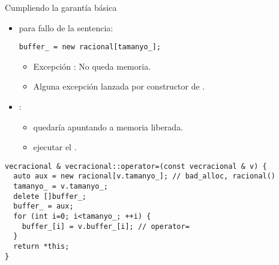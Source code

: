 \begin{frame}[t,fragile]{Cumpliendo la garantía básica}
\begin{itemize}
  \item {} para fallo de la sentencia:
\begin{lstlisting}
buffer_ = new racional[tamanyo_];
\end{lstlisting}
    \begin{itemize}
      \item Excepción : No queda memoria.
      \item Alguna excepción lanzada por constructor de .
    \end{itemize}

  \item {}:
    \begin{itemize}
      \item {} quedaría apuntando a memoria liberada.
      \item {} ejecutar el .
    \end{itemize}
\end{itemize}

\begin{lstlisting}
vecracional & vecracional::operator=(const vecracional & v) {
  auto aux = new racional[v.tamanyo_]; // bad_alloc, racional()
  tamanyo_ = v.tamanyo_;
  delete []buffer_;
  buffer_ = aux;
  for (int i=0; i<tamanyo_; ++i) {
    buffer_[i] = v.buffer_[i]; // operator=
  }
  return *this;
}
\end{lstlisting}
\end{frame}

